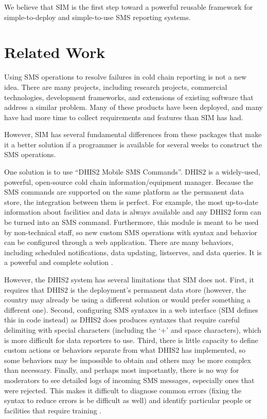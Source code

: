 \documentclass{acm_proc_article-sp}
\begin{document}
We believe that SIM is the first step toward a powerful reusable framework for simple-to-deploy and simple-to-use SMS reporting systems.

\section{Related Work}

Using SMS operations to resolve failures in cold chain reporting is not a new idea. There are many projects, including research projects, commercial technologies, development frameworks, and extensions of existing software that address a similar problem. Many of these products have been deployed, and many have had more time to collect requirements and features than SIM has had.

However, SIM has several fundamental differences from these packages that make it a better solution if a programmer is available for several weeks to construct the SMS operations.

One solution is to use ``DHIS2 Mobile SMS Commands''. DHIS2 is a widely-used, powerful, open-source cold chain information/equipment manager. Because the SMS commands are supported on the same platform as the permanent data store, the integration between them is perfect. For example, the most up-to-date information about facilities and data is always available and any DHIS2 form can be turned into an SMS command. Furthermore, this module is meant to be used by non-technical staff, so new custom SMS operations with syntax and behavior can be configured through a web application. There are many behaviors, including scheduled notifications, data updating, listserves, and data queries. It is a powerful and complete solution \cite{dhis2:smsref, dhis2:smsoverview}.

However, the DHIS2 system has several limitations that SIM does not. First, it requires that DHIS2 is the deployment's permanent data store (however, the country may already be using a different solution or would prefer something a different one). Second, configuring SMS syntaxes in a web interface (SIM defines this in code instead) as DHIS2 does produces syntaxes that require careful delimiting with special characters (including the `+' and space characters), which is more difficult for data reporters to use. Third, there is little capacity to define custom actions or behaviors separate from what DHIS2 has implemented, so some behaviors may be impossible to obtain and others may be more complex than necessary. Finally, and perhaps most importantly, there is no way for moderators to see detailed logs of incoming SMS messages, especially ones that were rejected. This makes it difficult to diagnose common errors (fixing the syntax to reduce errors is be difficult as well) and identify particular people or facilities that require training \cite{dhis2:smsref, dhis2:smsoverview}.
\end{document}
